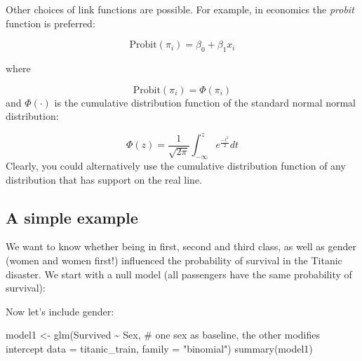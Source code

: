 \documentclass[
  letterpaper,
  DIV=11,
  numbers=noendperiod]{scrreprt}
\newenvironment{Shaded}{\begin{snugshade}}{\end{snugshade}}
\newcommand{\NormalTok}[1]{\textcolor[rgb]{0.00,0.23,0.31}{#1}}
\begin{document}
Other choices of link functions are possible. For example, in economics
the \emph{probit} function is preferred:

\[
\text{Probit}(\pi_i) = \beta_0 + \beta_1 x_i
\]

where

\[
\text{Probit}(\pi_i) = \Phi(\pi_i)
\] and \(\Phi(\cdot)\) is the cumulative distribution function of the
standard normal normal distribution:

\[
\Phi(z) = \frac{1}{\sqrt{2 \pi}}\int_{-\infty}^z e^{\frac{-t^2}{2}} dt
\] Clearly, you could alternatively use the cumulative distribution
function of any distribution that has support on the real line.

\subsection{A simple example}\label{a-simple-example}

We want to know whether being in first, second and third class, as well
as gender (women and women first!) influenced the probability of
survival in the Titanic disaster. We start with a null model (all
passengers have the same probability of survival):

\begin{Shaded}
\end{Shaded}

Now let's include gender:

\begin{Shaded}
\begin{Highlighting}[]
\NormalTok{model1 \textless{}{-} glm(Survived \textasciitilde{} Sex, \# one sex as baseline, the other modifies intercept}
\NormalTok{              data = titanic\_train,}
\NormalTok{              family = "binomial")}
\NormalTok{summary(model1)}
\end{Highlighting}
\end{Shaded}
\end{document}
